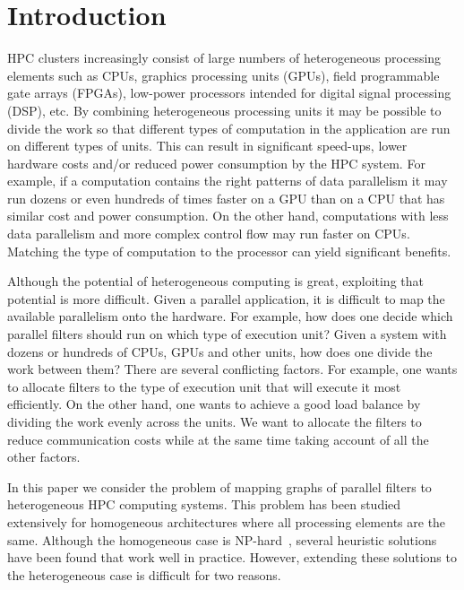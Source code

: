 \section{Introduction}
\label{sec:introduction}

HPC clusters increasingly consist of large numbers of heterogeneous
processing elements such as CPUs, graphics processing units (GPUs),
field programmable gate arrays (FPGAs), low-power processors intended
for digital signal processing (DSP), etc. By combining heterogeneous
processing units it may be possible to divide the work so that different
types of computation in the application are run on different types of
units. This can result in significant speed-ups, lower hardware costs
and/or reduced power consumption by the HPC system.  For example, if a
computation contains the right patterns of data parallelism it may run
dozens or even hundreds of times faster on a GPU than on a CPU that has
similar cost and power consumption. On the other hand, computations with
less data parallelism and more complex control flow may run faster on
CPUs. Matching the type of computation to the processor can yield
significant benefits.

Although the potential of heterogeneous computing is great, exploiting
that potential is more difficult. Given a parallel application, it is
difficult to map the available parallelism onto the hardware. For
example, how does one decide which parallel filters should run on which
type of execution unit? Given a system with dozens or hundreds of CPUs,
GPUs and other units, how does one divide the work between them?  There
are several conflicting factors. For example, one wants to allocate
filters to the type of execution unit that will execute it most
efficiently. On the other hand, one wants to achieve a good load balance
by dividing the work evenly across the units. %
We want to allocate the filters to reduce communication costs while at the
same time taking account of all the other factors.

In this paper we consider the problem of mapping graphs of parallel
filters to heterogeneous HPC computing systems. This problem has been
studied extensively for homogeneous architectures where all processing
elements are the same. Although the homogeneous case is
NP-hard~\cite{vsar89}, several heuristic solutions have been found that
work well in practice. However, extending these solutions to the
heterogeneous case is difficult for two reasons.


